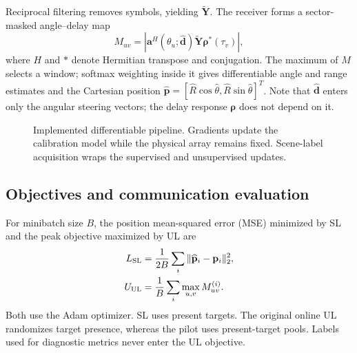 \documentclass[conference]{IEEEtran}
\begin{document}
Reciprocal filtering removes symbols, yielding $\widetilde{\mathbf Y}$. The receiver forms a sector-masked angle--delay map
\begin{equation}
 M_{uv}=\left|\mathbf a^H(\theta_u;\widehat{\mathbf d})
       \widetilde{\mathbf Y}\bm\rho^*(\tau_v)\right|,
\end{equation}
where $H$ and $*$ denote Hermitian transpose and conjugation. The maximum of $M$ selects a window; softmax weighting inside it gives differentiable angle and range estimates and the Cartesian position $\widehat{\mathbf p}=[\widehat R\cos\widehat\theta,\widehat R\sin\widehat\theta]^T$. Note that $\widehat{\mathbf d}$ enters only the angular steering vectors; the delay response $\bm\rho$ does not depend on it.
\begin{figure}[t]\centering
{}
\caption{Implemented differentiable pipeline. Gradients update the calibration model while the physical array remains fixed. Scene-label acquisition wraps the supervised and unsupervised updates.}
\label{fig:architecture}
\end{figure}
\subsection{Objectives and communication evaluation}
For minibatch size $B$, the position mean-squared error (MSE) minimized by SL and the peak objective maximized by UL are
\begin{align}
 L_{\rm SL}&=\frac{1}{2B}\sum_i\|\widehat{\mathbf p}_i-\mathbf p_i\|_2^2,\\
 U_{\rm UL}&=\frac1B\sum_i\max_{u,v}M^{(i)}_{uv}.
\end{align}
Both use the Adam optimizer. SL uses present targets. The original online UL randomizes target presence, whereas the pilot uses present-target pools. Labels used for diagnostic metrics never enter the UL objective.
\end{document}
